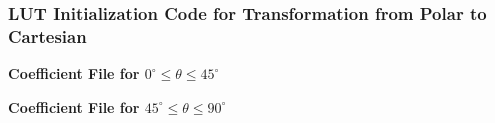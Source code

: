 \subsubsection{LUT Initialization Code for Transformation from Polar to Cartesian} \label{coe_file}
\textbf{Coefficient File for $0^\circ{}\leq{}\theta{}\leq45^\circ$}
\singlespacing

\doublespacing
\par
\textbf{Coefficient File for $45^\circ{}\leq{}\theta{}\leq90^\circ$}
\singlespacing

\doublespacing

